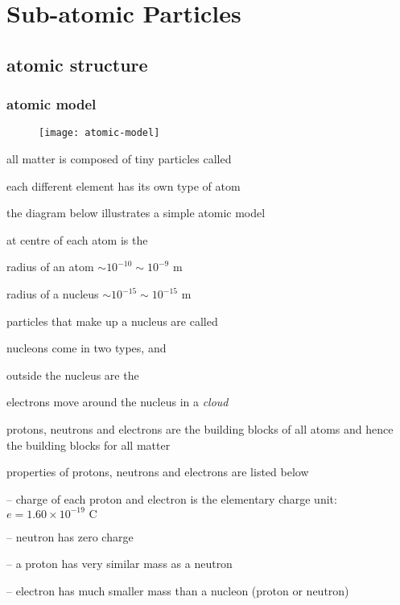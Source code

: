 \section{Sub-atomic Particles}

\subsection{atomic structure}

\subsubsection{atomic model}\label{ch:atomic-model}

\begin{wrapfigure}{r}{0.4\textwidth}
	\vspace*{5pt}
	\centering
	\texttt{[image: atomic-model]}
	\vspace*{-20pt}
\end{wrapfigure}

all matter is composed of tiny particles called 

each different element has its own type of atom

the diagram below illustrates a simple atomic model


\cmt at centre of each atom is the 

\cmt radius of an atom $\sim 10^{-10} \sim 10^{-9} \text{ m}$

radius of a nucleus $\sim 10^{-15} \sim 10^{-15} \text{ m}$

\cmt particles that make up a nucleus are called 

nucleons come in two types,  and 

\cmt outside the nucleus are the 

electrons move around the nucleus in a \emph{cloud}

\cmt protons, neutrons and electrons are the building blocks of all atoms and hence the building blocks for all matter

\cmt properties of protons, neutrons and electrons are listed below

\begin{compactenum}
	\item[--] charge of each proton and electron is the elementary charge unit: $e = 1.60 \times10^{-19} \text{ C}$
	
	\item[--] neutron has zero charge
	
	\item[--] a proton has very similar mass as a neutron
	
	\item[--] electron has much smaller mass than a nucleon (proton or neutron)
\end{compactenum}

